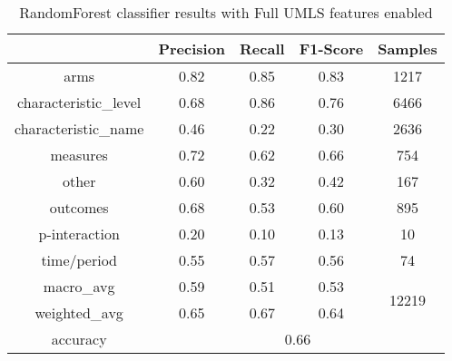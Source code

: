 \begin{table}
	\centering
	\begin{tabular}{c|c|c|c|c}
		
		&\textbf{Precision} &  \textbf{Recall} & \textbf{F1-Score} & \textbf{Samples} \\
		\hline 
		\hline 
		
		arms & 0.82 & 0.85 & 0.83 & 1217 \\
		\hline
		characteristic\_level & 0.68 & 0.86 & 0.76 & 6466 \\
		\hline
		characteristic\_name & 0.46 & 0.22 & 0.30 & 2636 \\
		\hline
		measures & 0.72 & 0.62 & 0.66 & 754 \\
		\hline
		other & 0.60 & 0.32 & 0.42 & 167 \\
		\hline
		outcomes & 0.68 & 0.53 & 0.60 & 895 \\
		\hline
		p-interaction & 0.20 & 0.10 & 0.13 & 10 \\
		\hline
		time/period & 0.55 & 0.57 & 0.56 & 74 \\
		\hline
		\hline
		macro\_avg & 0.59 & 0.51 & 0.53 & \multirow{2}{*}{12219}  \\
		\cline{1-4}
		weighted\_avg & 0.65 & 0.67 & 0.64 & \\
		\hline
		\hline	
		accuracy & \multicolumn{4}{c}{0.66} \\ 
		\hline
	\end{tabular} 
	\caption{\label{tab:RF-all} RandomForest classifier results with Full UMLS features enabled }
\end{table}


